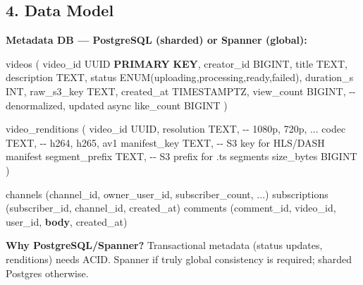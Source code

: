 \documentclass[11pt]{article}
\newenvironment{Shaded}{\begin{snugshade}}{\end{snugshade}}
\newcommand{\CommentTok}[1]{\textcolor[rgb]{0.48,0.49,0.49}{#1}}
\newcommand{\DataTypeTok}[1]{\textcolor[rgb]{0.16,0.50,0.73}{#1}}
\newcommand{\KeywordTok}[1]{\textcolor[rgb]{0.81,0.81,0.76}{\textbf{#1}}}
\newcommand{\NormalTok}[1]{\textcolor[rgb]{0.81,0.81,0.76}{#1}}
\newcommand{\OperatorTok}[1]{\textcolor[rgb]{0.81,0.81,0.76}{#1}}
\newcommand{\StringTok}[1]{\textcolor[rgb]{0.96,0.31,0.31}{#1}}
\begin{document}
\subsection{4. Data Model}\label{4-data-model}

\textbf{Metadata DB --- PostgreSQL (sharded) or Spanner (global):}


\begin{Shaded}
\begin{Highlighting}[]
\NormalTok{videos (}
\NormalTok{  video\_id        UUID }\KeywordTok{PRIMARY} \KeywordTok{KEY}\NormalTok{,}
\NormalTok{  creator\_id      BIGINT,}
\NormalTok{  title           TEXT,}
\NormalTok{  description     TEXT,}
\NormalTok{  status          ENUM(}\StringTok{\textquotesingle{}uploading\textquotesingle{}}\NormalTok{,}\StringTok{\textquotesingle{}processing\textquotesingle{}}\NormalTok{,}\StringTok{\textquotesingle{}ready\textquotesingle{}}\NormalTok{,}\StringTok{\textquotesingle{}failed\textquotesingle{}}\NormalTok{),}
\NormalTok{  duration\_s      }\DataTypeTok{INT}\NormalTok{,}
\NormalTok{  raw\_s3\_key      TEXT,}
\NormalTok{  created\_at      TIMESTAMPTZ,}
\NormalTok{  view\_count      BIGINT,     }\CommentTok{{-}{-} denormalized, updated async}
\NormalTok{  like\_count      BIGINT}
\NormalTok{)}

\NormalTok{video\_renditions (}
\NormalTok{  video\_id        UUID,}
\NormalTok{  resolution      TEXT,       }\CommentTok{{-}{-} \textquotesingle{}1080p\textquotesingle{}, \textquotesingle{}720p\textquotesingle{}, ...}
\NormalTok{  codec           TEXT,       }\CommentTok{{-}{-} \textquotesingle{}h264\textquotesingle{}, \textquotesingle{}h265\textquotesingle{}, \textquotesingle{}av1\textquotesingle{}}
\NormalTok{  manifest\_key    TEXT,       }\CommentTok{{-}{-} S3 key for HLS/DASH manifest}
\NormalTok{  segment\_prefix  TEXT,       }\CommentTok{{-}{-} S3 prefix for .ts segments}
\NormalTok{  size\_bytes      BIGINT}
\NormalTok{)}

\NormalTok{channels (channel\_id, owner\_user\_id, subscriber\_count, }\OperatorTok{..}\NormalTok{.)}
\NormalTok{subscriptions (subscriber\_id, channel\_id, created\_at)}
\NormalTok{comments (comment\_id, video\_id, user\_id, }\KeywordTok{body}\NormalTok{, created\_at)}
\end{Highlighting}
\end{Shaded}

\textbf{Why PostgreSQL/Spanner?} Transactional metadata (status updates, renditions) needs ACID. Spanner if truly global consistency is required; sharded Postgres otherwise.
\end{document}
